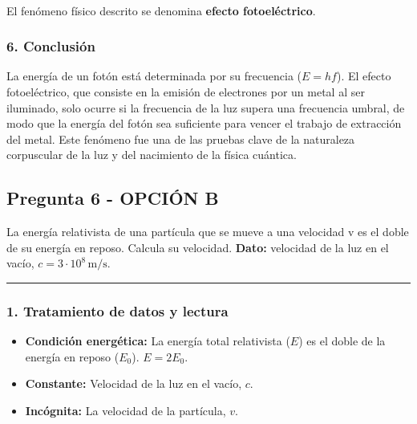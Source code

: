 \paragraph{}
\begin{cajaresultado}
    El fenómeno físico descrito se denomina \textbf{efecto fotoeléctrico}.
\end{cajaresultado}

\subsubsection*{6. Conclusión}
\begin{cajaconclusion}
La energía de un fotón está determinada por su frecuencia ($E=hf$). El efecto fotoeléctrico, que consiste en la emisión de electrones por un metal al ser iluminado, solo ocurre si la frecuencia de la luz supera una frecuencia umbral, de modo que la energía del fotón sea suficiente para vencer el trabajo de extracción del metal. Este fenómeno fue una de las pruebas clave de la naturaleza corpuscular de la luz y del nacimiento de la física cuántica.
\end{cajaconclusion}

\newpage

\subsection{Pregunta 6 - OPCIÓN B}
\label{subsec:6B_2015_jun_ord}

\begin{cajaenunciado}
La energía relativista de una partícula que se mueve a una velocidad v es el doble de su energía en reposo. Calcula su velocidad.
\textbf{Dato:} velocidad de la luz en el vacío, $c=3\cdot10^{8}\,\text{m/s}$.
\end{cajaenunciado}
\hrule

\subsubsection*{1. Tratamiento de datos y lectura}
\begin{itemize}
    \item \textbf{Condición energética:} La energía total relativista ($E$) es el doble de la energía en reposo ($E_0$). $E = 2E_0$.
    \item \textbf{Constante:} Velocidad de la luz en el vacío, $c$.
    \item \textbf{Incógnita:} La velocidad de la partícula, $v$.
\end{itemize}

